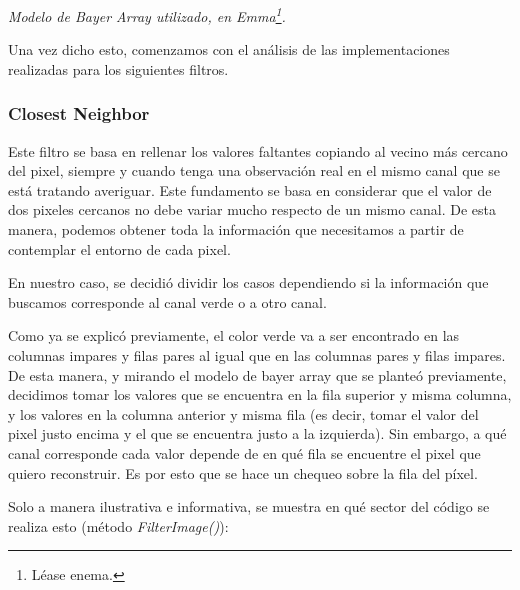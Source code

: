 \begin{center}
		\par 
		\vspace{2pt}
		\footnotesize\textit{Modelo de Bayer Array utilizado, en Emma\footnote{Léase enema.}.}
	\end{center}
	\par 
	


\vspace{\baselineskip}

Una vez dicho esto, comenzamos con el análisis de las implementaciones realizadas para los siguientes filtros.
	
\subsubsection{Closest Neighbor}

Este filtro se basa en rellenar los valores faltantes copiando al vecino más
cercano del pixel, siempre y cuando tenga una observación real en el mismo canal que se está tratando averiguar. Este fundamento se basa en considerar que el valor de dos pixeles cercanos no debe variar mucho respecto de un mismo canal. De esta manera, podemos obtener toda la información que necesitamos a partir de contemplar el entorno de cada pixel.

\vspace{\baselineskip}

En nuestro caso, se decidió dividir los casos dependiendo si la información que buscamos corresponde al canal verde o a otro canal.

\vspace{\baselineskip}

Como ya se explicó previamente, el color verde va a ser encontrado en las columnas impares y filas pares al igual que en las columnas pares y filas impares. De esta manera, y mirando el modelo de bayer array que se planteó previamente, decidimos tomar los valores que se encuentra en la fila superior y misma columna, y los valores en la columna anterior y misma fila (es decir, tomar el valor del pixel justo encima y el que se encuentra justo a la izquierda). Sin embargo, a qué canal corresponde cada valor depende de en qué fila se encuentre el pixel que quiero reconstruir. Es por esto que se hace un chequeo sobre la fila del píxel.

\vspace{\baselineskip}

Solo a manera ilustrativa e informativa, se muestra en qué sector del código se realiza esto (método \textit{FilterImage()}): 

